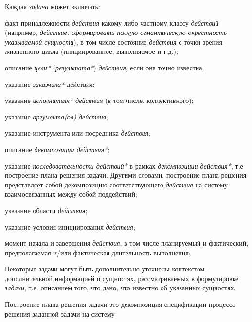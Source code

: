 \begin{SCn}
{Каждая \textit{задача} может включать:
\begin{scnitemize}
    \item факт принадлежности \textit{действия} какому-либо частному классу \textit{действий} (например,\textit{ действие. сформировать полную семантическую окрестность указываемой сущности}), в том числе состояние \textit{действия} с точки зрения жизненного цикла (инициированное, выполняемое и т.д.);
    \item описание \textit{цели*} (\textit{результата*}) \textit{действия}, если она точно известна;
    \item указание \textit{заказчика*} действия;
    \item указание \textit{исполнителя* действия} (в том числе, коллективного);
    \item указание \textit{аргумента(ов) действия\scnrolesign};
    \item указание инструмента или посредника \textit{действия};
    \item описание \textit{декомпозиции действия*};
    \item указание \textit{последовательности действий*} в рамках \textit{декомпозиции действия*}, т.е построение плана решения задачи. Другими словами, построение плана решения представляет собой декомпозицию соответствующего \textit{действия} на систему взаимосвязанных между собой поддействий;
    \item указание области \textit{действия};
    \item указание условия инициирования \textit{действия};
    \item момент начала и завершения \textit{действия}, в том числе планируемый и фактический, предполагаемая и/или фактическая длительность выполнения;
\end{scnitemize}
Некоторые задачи могут быть дополнительно уточнены контекстом – дополнительной информацией о сущностях, рассматриваемых в формулировке \textit{задачи}, т.е. описанием того, что дано, что известно об указанных сущностях.

Построение плана решения задачи это декомпозиция спецификации процесса решения заданной задачи на систему 
 
}
\end{SCn}
